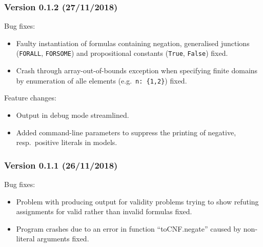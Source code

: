\documentclass[twoside]{article}
\begin{document}
\subsubsection*{Version 0.1.2 (27/11/2018)}
Bug fixes:
\begin{itemize}
\item Faulty instantiation of formulas containing negation, generalised junctions (\texttt{FORALL}, \texttt{FORSOME}) and propositional constants (\texttt{True}, \texttt{False}) fixed.
\item Crash through array-out-of-bounds exception when specifying finite domains by enumeration of alle elements (e.g.\ \texttt{n:~\{1,2\}}) fixed.
\end{itemize}
Feature changes:
\begin{itemize}
\item Output in debug mode streamlined.
\item Added command-line parameters to suppress the printing of negative, resp.\ positive literals in models.
\end{itemize}

\subsubsection*{Version 0.1.1 (26/11/2018)}

Bug fixes:
\begin{itemize}
\item Problem with producing output for validity problems trying to show refuting assignments for valid rather than invalid formulas fixed. 
\item Program crashes due to an error in function ``toCNF.negate'' caused by non-literal arguments fixed. 
\end{itemize}

 

 
\end{document}
